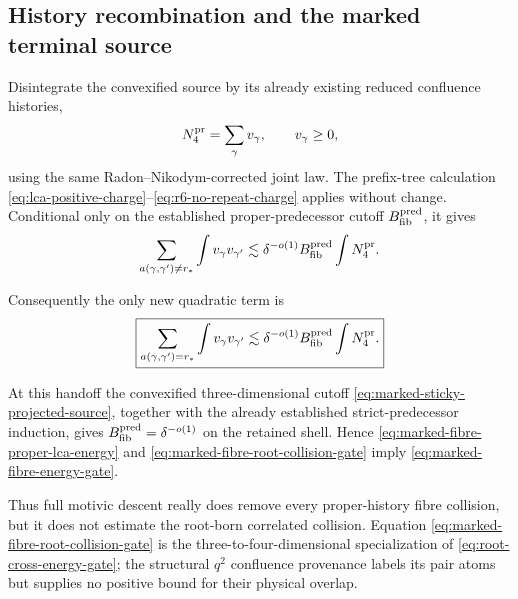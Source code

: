 \documentclass[11pt]{article}
\begin{document}
\subsection{History recombination and the marked terminal source}

Disintegrate the convexified source by its already existing reduced confluence
histories,
\[
 N_4^{\rm pr}=\sum_\gamma v_\gamma,
 \qquad v_\gamma\ge0,
\]
using the same Radon--Nikodym-corrected joint law.  The prefix-tree calculation
\eqref{eq:lca-positive-charge}--\eqref{eq:r6-no-repeat-charge} applies
without change.  Conditional only on the established proper-predecessor
cutoff \(B_{\rm fib}^{\rm pred}\), it gives
\begin{equation}\label{eq:marked-fibre-proper-lca-energy}
 \sum_{a(\gamma,\gamma')\ne r_\ast}
   \int v_\gamma v_{\gamma'}
 \lesssim
 \delta^{-o(1)}B_{\rm fib}^{\rm pred}
 \int N_4^{\rm pr}.
\end{equation}

Consequently the only new quadratic term is
\begin{equation}\label{eq:marked-fibre-root-collision-gate}
 \boxed{
 \sum_{a(\gamma,\gamma')=r_\ast}
   \int v_\gamma v_{\gamma'}
 \lesssim
 \delta^{-o(1)}B_{\rm fib}^{\rm pred}
 \int N_4^{\rm pr}.}
\end{equation}

At this handoff the convexified three-dimensional cutoff
\eqref{eq:marked-sticky-projected-source}, together with the already
established strict-predecessor induction, gives
\(B_{\rm fib}^{\rm pred}=\delta^{-o(1)}\) on the retained shell.
Hence \eqref{eq:marked-fibre-proper-lca-energy} and
\eqref{eq:marked-fibre-root-collision-gate} imply
\eqref{eq:marked-fibre-energy-gate}.

Thus full motivic descent really does remove every proper-history fibre
collision, but it does not estimate the root-born correlated collision.
Equation \eqref{eq:marked-fibre-root-collision-gate} is the
three-to-four-dimensional specialization of
\eqref{eq:root-cross-energy-gate}; the structural \(q^2\) confluence
provenance labels its pair atoms but supplies no positive bound for their
physical overlap.
\end{document}
